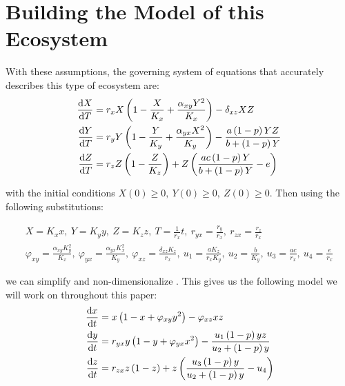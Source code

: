 \section{Building the Model of this Ecosystem}\label{sec:building-the-model-of-this-ecosystem}
With these assumptions, the governing system of equations that accurately describes this type of ecosystem are:
\begin{subequations}\label{model:rayla-ephraim-d}
    \begin{align}
        \diff[]{X}{T} &= r_xX\left(1-\frac{X}{K_x}+\frac{\alpha_{xy}Y^2}{K_x}\right)-\delta_{xz}XZ
        \label{eq:rayla-ephraim-d-x}\\
        \diff[]{Y}{T} &= r_yY\left(1-\frac{Y}{K_y}+\frac{\alpha_{yx}X^2}{K_y}\right)-\frac{a\left(1-p\right)YZ}{b+\left(1-p\right)Y}
        \label{eq:rayla-ephraim-d-y}\\
        \diff[]{Z}{T} &= r_zZ\left(1-\frac{Z}{K_z}\right)+Z\left(\frac{ac\left(1-p\right)Y}{b+\left(1-p\right)Y}-e\right)
        \label{eq:rayla-ephraim-d-z}
    \end{align}
\end{subequations}

with the initial conditions $X(0) \geq 0,\ Y(0) \geq 0,\ Z(0) \geq 0$. Then using the following substitutions:

\begin{gather*}
    X=K_xx,\ Y=K_yy,\ Z=K_zz,\ T=\frac{1}{r_x}t,\ r_{yx}=\frac{r_y}{r_x},\ r_{zx}=\frac{r_z}{r_x}\\
    \varphi_{xy}=\frac{\alpha_{xy}K_y^2}{K_x},\ \varphi_{yx}=\frac{\alpha_{yx}K_x^2}{K_y},\ \varphi_{xz}=\frac{\delta_{xz}K_z}{r_x},\ u_1=\frac{aK_z}{r_xK_y},\ u_2=\frac{b}{K_y},\ u_3=\frac{ac}{r_x},\ u_4=\frac{e}{r_x}
\end{gather*}

we can simplify and non-dimensionalize . This gives us the following model we will work on throughout this paper:
\begin{subequations}\label{model:rayla-ephraim}
    \begin{align}
        \diff[]{x}{t} &= x\left(1-x+\varphi_{xy}y^2\right)-\varphi_{xz}xz
        \label{eq:rayla-ephraim-x}\\
        \diff[]{y}{t} &= r_{yx}y\left(1-y+\varphi_{yx}x^2\right)-\frac{u_1\left(1-p\right)yz}{u_2+\left(1-p\right)y}
        \label{eq:rayla-ephraim-y}\\
        \diff[]{z}{t} &= r_{zx}z\left(1-z\right)+z\left(\frac{u_3\left(1-p\right)y}{u_2+\left(1-p\right)y}-u_4\right)
        \label{eq:rayla-ephraim-z}
    \end{align}
\end{subequations}

